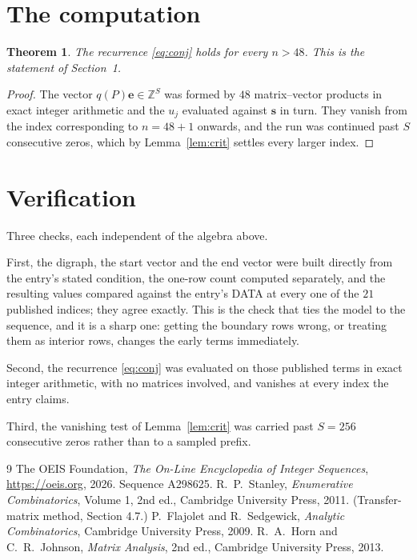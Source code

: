 \documentclass[11pt,a4paper]{article}
\theoremstyle{plain}
\newtheorem{theorem}{Theorem}
\theoremstyle{definition}
\begin{document}
\section{The computation}

\begin{theorem}
The recurrence \eqref{eq:conj} holds for every $n>48$. This is the statement of
Section~1.
\end{theorem}

\begin{proof}
The vector $q(P)\mathbf{e}\in\mathbb{Z}^{S}$ was formed by $48$ matrix--vector
products in exact integer arithmetic and the $u_j$ evaluated against $\mathbf{s}$ in turn.
They vanish from the index corresponding to $n=48+1$ onwards, and the run was continued
past $S$ consecutive zeros, which by Lemma~\ref{lem:crit} settles every larger index.
\end{proof}

\section{Verification}

Three checks, each independent of the algebra above.

First, the digraph, the start vector and the end vector were built directly from the
entry's stated condition, the one-row count computed separately, and the resulting values
compared against the entry's DATA at every one of the $21$ published indices; they
agree exactly. This is the check that ties the model to the sequence, and it is a sharp one:
getting the boundary rows wrong, or treating them as interior rows, changes the early terms
immediately.

Second, the recurrence \eqref{eq:conj} was evaluated on those published terms in exact
integer arithmetic, with no matrices involved, and vanishes at every index the entry claims.

Third, the vanishing test of Lemma~\ref{lem:crit} was carried past $S=256$ consecutive
zeros rather than to a sampled prefix.

\begin{thebibliography}{9}
 The OEIS Foundation, \emph{The On-Line Encyclopedia of Integer
Sequences}, \url{https://oeis.org}, 2026. Sequence A298625.
 R.~P.~Stanley, \emph{Enumerative Combinatorics}, Volume 1, 2nd ed.,
Cambridge University Press, 2011. (Transfer-matrix method, Section 4.7.)
 P.~Flajolet and R.~Sedgewick, \emph{Analytic Combinatorics}, Cambridge
University Press, 2009.
 R.~A.~Horn and C.~R.~Johnson, \emph{Matrix Analysis}, 2nd ed., Cambridge
University Press, 2013.
\end{thebibliography}
\end{document}
